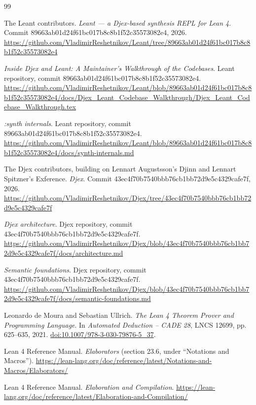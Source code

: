 \documentclass[10pt,letterpaper,oneside]{report}
\newcommand{\commitid}[1]{{\ttfamily\footnotesize #1}}
\begin{document}
\begin{thebibliography}{99}

The Leant contributors.
\emph{Leant --- a Djex-based synthesis REPL for Lean 4}.
Commit \commitid{89663ab01d24f61bc017b8c8b1f52c35573082e4}, 2026.
\url{https://github.com/VladimirReshetnikov/Leant/tree/89663ab01d24f61bc017b8c8b1f52c35573082e4}

\emph{Inside Djex and Leant: A Maintainer's Walkthrough of the Codebases}.
Leant repository, commit \commitid{89663ab01d24f61bc017b8c8b1f52c35573082e4}.
\url{https://github.com/VladimirReshetnikov/Leant/blob/89663ab01d24f61bc017b8c8b1f52c35573082e4/docs/Djex_Leant_Codebase_Walkthrough/Djex_Leant_Codebase_Walkthrough.tex}

\emph{:synth internals}.
Leant repository, commit \commitid{89663ab01d24f61bc017b8c8b1f52c35573082e4}.
\url{https://github.com/VladimirReshetnikov/Leant/blob/89663ab01d24f61bc017b8c8b1f52c35573082e4/docs/synth-internals.md}

The Djex contributors, building on Lennart Augustsson's Djinn and Lennart Spitzner's Exference.
\emph{Djex}.
Commit \commitid{43ec4f70b7540bbb76cb1bb72d9e5c4329cafe7f}, 2026.
\url{https://github.com/VladimirReshetnikov/Djex/tree/43ec4f70b7540bbb76cb1bb72d9e5c4329cafe7f}

\emph{Djex architecture}.
Djex repository, commit \commitid{43ec4f70b7540bbb76cb1bb72d9e5c4329cafe7f}.
\url{https://github.com/VladimirReshetnikov/Djex/blob/43ec4f70b7540bbb76cb1bb72d9e5c4329cafe7f/docs/architecture.md}

\emph{Semantic foundations}.
Djex repository, commit \commitid{43ec4f70b7540bbb76cb1bb72d9e5c4329cafe7f}.
\url{https://github.com/VladimirReshetnikov/Djex/blob/43ec4f70b7540bbb76cb1bb72d9e5c4329cafe7f/docs/semantic-foundations.md}

Leonardo de Moura and Sebastian Ullrich.
\emph{The Lean 4 Theorem Prover and Programming Language}.
In \emph{Automated Deduction -- CADE 28}, LNCS 12699, pp. 625--635, 2021.
\href{https://doi.org/10.1007/978-3-030-79876-5_37}{doi:10.1007/978-3-030-79876-5\_37}.

Lean 4 Reference Manual.
\emph{Elaborators} (section 23.6, under ``Notations and Macros'').
\url{https://lean-lang.org/doc/reference/latest/Notations-and-Macros/Elaborators/}

Lean 4 Reference Manual.
\emph{Elaboration and Compilation}.
\url{https://lean-lang.org/doc/reference/latest/Elaboration-and-Compilation/}


\end{thebibliography}
\end{document}
